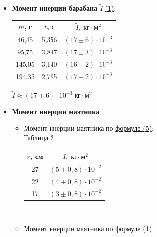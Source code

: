 \documentclass{article}
\begin{document}
\begin{itemize}
\begin{itemize}
$$ m_0=-\frac{b}{k}$$

 \begin{equation*}
	\fbox{$ m_0= ({-}8\pm18)\cdot10^{-3}\;\mbox{кг}$}
\end{equation*}
По \hyperlink{formuls}{формуле (4)}:\\

$M_{\mbox{сопр.}}= ({-}2\pm6)\cdot10^3\;\mbox{Н}$
\end{itemize}
\item {\bf Момент инерции барабана $\tilde{I}$} \hyperlink{formuls}{(1)}:\\

\begin{tabular}{c|c||c||}
	
	$m$, г& $t$, с &$\tilde I{,}\;\mbox{кг}\cdot\mbox{м}^2$\\
	\hline
	46,45& 5,356& $(17\pm6)\cdot10^{-3}$\\
	
	95,75& 3,847 &$(17\pm3)\cdot10^{-3}$\\
	
	145,05& 3,140& $(16\pm2)\cdot10^{-3}$\\
	
	194,35& 2,785& $(17\pm2)\cdot10^{-3}$\\
\end{tabular}

$\tilde{I}\approx(17\pm6)\cdot10^{-3}\;\mbox{кг}\cdot\mbox{м}^2$

\item {\bf Момент инерции маятника}
\begin{itemize}
	\item Момент инерции маятника по \hyperlink{formuls}{формуле (5)}:\\
	
Таблица 2\\
	\begin{tabular}{|c|c|}
		\hline
		$r$, см&  $I{,}\;\mbox{кг}\cdot\mbox{м}^2$\\
		\hline
		27& $(5\pm0,8)\cdot10^{-2}$ \\
		
		22&  $(4\pm0,8)\cdot10^{-2}$\\
	
		17&  $(3\pm0,8)\cdot10^{-2}$\\
		\hline
	\end{tabular}\\

	\item Момент инерции маятника по \hyperlink{formuls}{формуле (1)}\\


\end{itemize}
\end{itemize}
\end{document}
